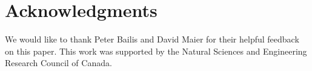 \section*{Acknowledgments}
We would like to thank Peter Bailis and David Maier for their helpful feedback
on this paper.  This work was supported by the Natural Sciences and Engineering
Research Council of Canada.
